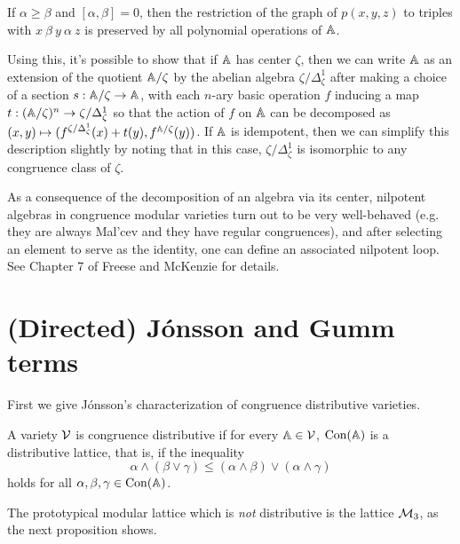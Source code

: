 \begin{appendices}
\begin{cor}\label{difference-graph} If $\alpha \ge \beta$ and $[\alpha,\beta] = 0$, then the restriction of the graph of $p(x,y,z)$ to triples with $x\ \beta\ y\ \alpha\ z$ is preserved by all polynomial operations of $\mathbb{A}$.
\end{cor}

Using this, it's possible to show that if $\mathbb{A}$ has center $\zeta$, then we can write $\mathbb{A}$ as an extension of the quotient $\mathbb{A}/\zeta$ by the abelian algebra $\zeta/\Delta_\zeta^1$ after making a choice of a section $s : \mathbb{A}/\zeta \rightarrow \mathbb{A}$, with each $n$-ary basic operation $f$ inducing a map $t : (\mathbb{A}/\zeta)^n \rightarrow \zeta/\Delta_\zeta^1$ so that the action of $f$ on $\mathbb{A}$ can be decomposed as $(x,y) \mapsto (f^{\zeta/\Delta_\zeta^1}(x) + t(y), f^{\mathbb{A}/\zeta}(y))$. If $\mathbb{A}$ is idempotent, then we can simplify this description slightly by noting that in this case, $\zeta/\Delta_\zeta^1$ is isomorphic to any congruence class of $\zeta$.

As a consequence of the decomposition of an algebra via its center, nilpotent algebras in congruence modular varieties turn out to be very well-behaved (e.g. they are always Mal'cev and they have regular congruences), and after selecting an element to serve as the identity, one can define an associated nilpotent loop. See Chapter 7 of Freese and McKenzie \cite{commutator-theory} for details.


\section{(Directed) J\'onsson and Gumm terms}

First we give J\'onsson's \cite{jonsson-distributive} characterization of congruence distributive varieties.

\begin{defn} A variety $\mathcal{V}$ is congruence distributive if for every $\mathbb{A} \in \mathcal{V}$, $\operatorname{Con}(\mathbb{A})$ is a distributive lattice, that is, if the inequality
\[
\alpha \wedge (\beta \vee \gamma) \le (\alpha \wedge \beta) \vee (\alpha \wedge \gamma)
\]
holds for all $\alpha, \beta, \gamma \in \operatorname{Con}(\mathbb{A})$.
\end{defn}

The prototypical modular lattice which is \emph{not} distributive is the lattice $\mathcal{M}_3$, as the next proposition shows.


\end{appendices}
